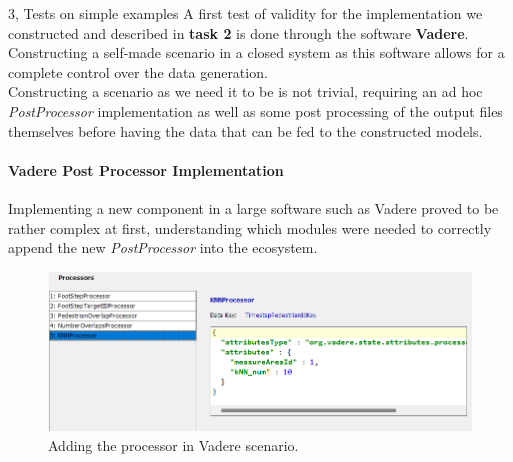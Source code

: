 \documentclass[10pt,a4paper]{article}
\begin{document}
\begin{task}{3, Tests on simple examples}
A first test of validity for the implementation we constructed and described in \textbf{task 2} is done through the software \textbf{Vadere}. Constructing a self-made scenario in a closed system as this software allows for a complete control over the data generation.\\
Constructing a scenario as we need it to be is not trivial, requiring an ad hoc \textit{PostProcessor} implementation as well as some post processing of the output files themselves before having the data that can be fed to the constructed models.
\paragraph{Vadere Post Processor Implementation}
Implementing a new component in a large software such as Vadere proved to be rather complex at first, understanding which modules were needed to correctly append the new \textit{PostProcessor} into the ecosystem.

\begin{figure}[h]
    \centering
    \includegraphics[scale=0.8]{images/add-proc.png}
    \caption{Adding the processor in Vadere scenario.}
    \label{fig:add-proc}
\end{figure}


\end{task}
\end{document}
